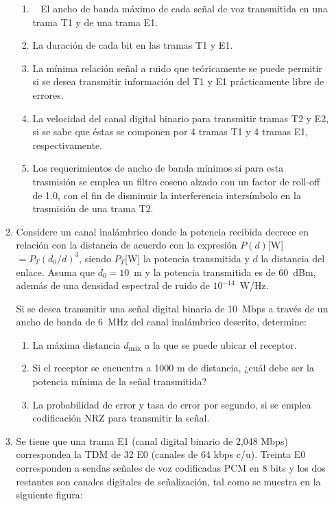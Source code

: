 \begin{enumerate}
\begin{enumerate}
	\begin{enumerate}
		\item~ El ancho de banda máximo de cada señal de voz transmitida en una trama T1 y de una trama E1.
		
		\item La duración de cada bit en las tramas T1 y E1.
		\item La mínima relación señal a ruido que teóricamente se puede permitir si se desea transmitir información del T1 y E1 prácticamente libre de errores.
		
		\item La velocidad del canal digital binario para transmitir tramas T2 y E2, si se sabe que éstas se componen por 4 tramas T1 y 4 tramas E1, respectivamente. 
		
		\item Los requerimientos de ancho de banda mínimos si para esta trasmisión se emplea un filtro coseno alzado con un factor de roll-off de 1.0, con el fin de disminuir la interferencia intersímbolo en la trasmisión de una trama T2.
		
	\end{enumerate}
	\item Considere un canal inalámbrico donde la potencia recibida decrece en relación con la distancia de acuerdo con la expresión $P(d)$[W]$=P_T(d_0/d)^3$, siendo $P_T$[W] la potencia transmitida y $d$ la distancia del enlace. Asuma que $d_0=10$~m y la potencia transmitida es de 60~dBm, además de una densidad espectral de ruido de $10^{-14}$~W/Hz.
	
	Si se desea transmitir una señal digital binaria de 10~Mbps a través de un ancho de banda de 6~MHz del canal inalámbrico descrito, determine:
	
	\begin{enumerate}
		
		\item La máxima distancia $d_{\mbox{máx}}$ a la que se puede ubicar el receptor.
		\item Si el receptor se encuentra a 1000 m de distancia, ¿cuál debe ser la potencia mínima de la señal transmitida?
		
		\item  La probabilidad de error y tasa de error por segundo, si se emplea codificación NRZ para transmitir la señal.
		
	\end{enumerate}
\item Se tiene que una trama E1 (canal digital binario de 2,048 Mbps) correspondea la TDM de 32 E0 (canales de 64 kbps c/u). Treinta E0 corresponden a sendas señales de voz codificadas PCM en 8 bits y los dos restantes son canales digitales de señalización, tal como se muestra en la siguiente figura:



\end{enumerate}
\end{enumerate}
